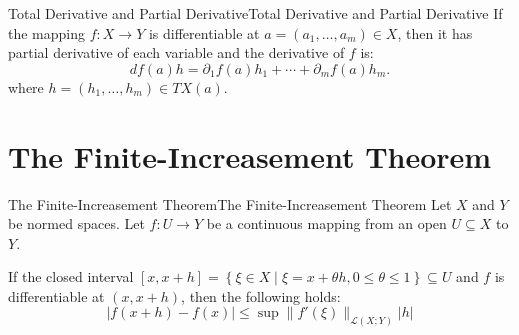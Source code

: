 \documentclass[../main.tex]{subfiles}
\begin{document}
\begin{proposition}{Total Derivative and Partial Derivative}{Total Derivative and Partial Derivative}
If the mapping $f: X \rightarrow Y$ is differentiable at $a = (a_1, \ldots ,a_m) \in X$, then it has partial derivative of each variable and the derivative of $f$ is:
\begin{equation*}
df(a) h = \partial _1f(a)h_1+\cdots +\partial _mf(a) h_m.
\end{equation*}
where $h = (h_1, \ldots ,h_m)\in TX(a)$.
\end{proposition}

\section{The Finite-Increasement Theorem}

\begin{theorem}{The Finite-Increasement Theorem}{The Finite-Increasement Theorem}
Let $X$ and $Y$ be normed spaces. Let $f: U \rightarrow Y$ be a continuous mapping from an open $U \subseteq X$ to $Y$.

If the closed interval $[x,x+h] = \left\{ \xi\in X \mid \xi=x+\theta h,0\leq \theta \leq 1 \right\} \subseteq U$ and $f$ is differentiable at $(x,x+h)$, then the following holds:
\begin{equation}
\left|f(x+h) - f(x)\right| \leq \sup \|f'(\xi)\|_{\mathscr{L}(X;Y)} \left|h\right|
\end{equation}
\end{theorem}
\end{document}

